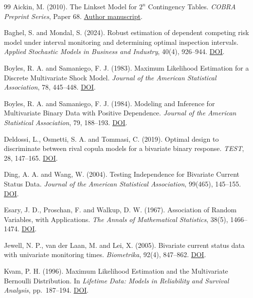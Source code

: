 \documentclass[11pt]{article}
\begin{document}
\begingroup
\linespread{0.96}\small
\begin{thebibliography}{99}
\setlength{\itemsep}{0pt}
\setlength{\parsep}{0pt}
 Aickin, M. (2010). The Linkset Model for \(2^n\) Contingency Tables. \emph{COBRA Preprint Series}, Paper 68. \href{https://citeseerx.ist.psu.edu/document?doi=28f930b5906fcd41df3e501ad4ecb4f0842f99b7&repid=rep1&type=pdf}{Author manuscript}.

 Baghel, S. and Mondal, S. (2024). Robust estimation of dependent competing risk model under interval monitoring and determining optimal inspection intervals. \emph{Applied Stochastic Models in Business and Industry}, 40(4), 926--944. \href{https://doi.org/10.1002/asmb.2854}{DOI}.

 Boyles, R. A. and Samaniego, F. J. (1983). Maximum Likelihood Estimation for a Discrete Multivariate Shock Model. \emph{Journal of the American Statistical Association}, 78, 445--448. \href{https://doi.org/10.1080/01621459.1983.10477992}{DOI}.

 Boyles, R. A. and Samaniego, F. J. (1984). Modeling and Inference for Multivariate Binary Data with Positive Dependence. \emph{Journal of the American Statistical Association}, 79, 188--193. \href{https://doi.org/10.1080/01621459.1984.10477083}{DOI}.

 Deldossi, L., Osmetti, S. A. and Tommasi, C. (2019). Optimal design to discriminate between rival copula models for a bivariate binary response. \emph{TEST}, 28, 147--165. \href{https://doi.org/10.1007/s11749-018-0595-1}{DOI}.

 Ding, A. A. and Wang, W. (2004). Testing Independence for Bivariate Current Status Data. \emph{Journal of the American Statistical Association}, 99(465), 145--155. \href{https://doi.org/10.1198/016214504000000142}{DOI}.

 Esary, J. D., Proschan, F. and Walkup, D. W. (1967). Association of Random Variables, with Applications. \emph{The Annals of Mathematical Statistics}, 38(5), 1466--1474. \href{https://doi.org/10.1214/aoms/1177698701}{DOI}.

 Jewell, N. P., van der Laan, M. and Lei, X. (2005). Bivariate current status data with univariate monitoring times. \emph{Biometrika}, 92(4), 847--862. \href{https://doi.org/10.1093/biomet/92.4.847}{DOI}.

 Kvam, P. H. (1996). Maximum Likelihood Estimation and the Multivariate Bernoulli Distribution. In \emph{Lifetime Data: Models in Reliability and Survival Analysis}, pp.~187--194. \href{https://doi.org/10.1007/978-1-4757-5654-8_25}{DOI}.


\end{thebibliography}
\end{document}
